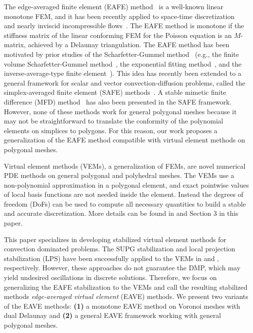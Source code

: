 \documentclass[a4paper]{article}
\theoremstyle{plain}
\theoremstyle{definition}
\numberwithin{equation}{section}
\begin{document}
The edge-averaged finite element (EAFE) method~\cite{XU99,LAZ05} is a well-known linear monotone FEM, and it has been recently applied to space-time discretization~\cite{bank2017arbitrary} and nearly inviscid incompressible flows~\cite{li2022new}.
The EAFE method is monotone if the stiffness matrix of the linear conforming FEM for the Poisson equation is an $M$-matrix, achieved by a Delaunay triangulation.
The EAFE method has been motivated by prior studies of the Scharfetter-Gummel method~\cite{scharfetter1969large} (e.g., the finite volume Scharfetter-Gummel method~\cite{bank1998finite}, the exponential fitting method~\cite{brezzi1989numerical, brezzi1989two, dorfler1999uniform}, and the inverse-average-type finite element~\cite{markowich1988inverse}).
This idea has recently been extended to a general framework for scalar and vector convection-diffusion problems, called the simplex-averaged finite element (SAFE) methods~\cite{wu2020simplex}.
A stable mimetic finite difference (MFD) method~\cite{adler2022stable} has also been presented in the SAFE framework.
However, none of these methods work for general polygonal meshes because it may not be straightforward to translate the conformity of the polynomial elements on simplices to polygons.
For this reason, our work proposes a generalization of the EAFE method compatible with virtual element methods on polygonal meshes.

Virtual element methods (VEMs), a generalization of FEMs, are novel numerical PDE methods on general polygonal and polyhedral meshes.
The VEMs use a non-polynomial approximation in a polygonal element, and exact pointwise values of local basis functions are not needed inside the element. Instead the degrees of freedom (DoFs) can be used to compute all necessary quantities to build a stable and accurate discretization.
More details can be found in \cite{BEI13,BEI14} and Section 3 in this paper.

This paper specializes in developing stabilized virtual element methods for convection dominated problems.
The SUPG stabilization and local projection stabilization (LPS) have been successfully applied to the VEMs in \cite{BEI20,BEN16,BER18} and \cite{LI21}, respectively.
However, these approaches do not guarantee the DMP, which may yield undesired oscillations in discrete solutions.
Therefore, we focus on generalizing the EAFE stabilization to the VEMs and call the resulting stabilized methods \textit{edge-averaged virtual element} (EAVE) methods.
We present two variants of the EAVE methods: \textbf{(1)} a monotone EAVE method on Voronoi meshes with dual Delaunay and \textbf{(2)} a general EAVE framework working with general polygonal meshes.
\end{document}
